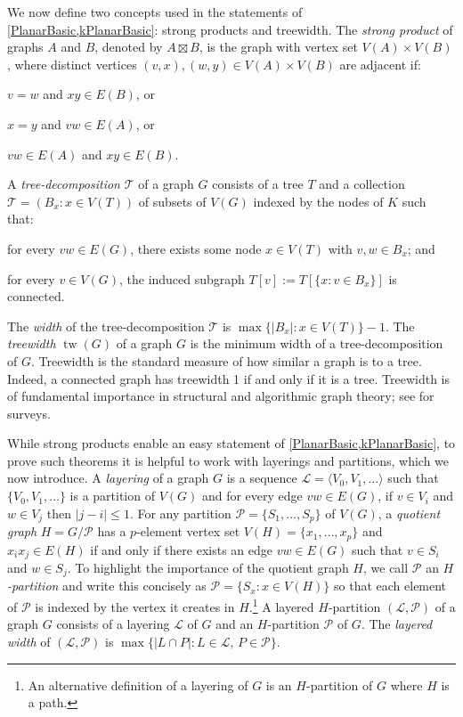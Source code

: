 \documentclass{patmorin}
\DeclareMathOperator{\tw}{tw}
\renewcommand{\leq}{\leqslant}
\begin{document}
We now define two concepts used in the statements of \cref{PlanarBasic,kPlanarBasic}: strong products and treewidth. The \emph{strong product} of graphs $A$ and $B$, denoted by $A\boxtimes B$, is the graph with vertex set $V(A)\times V(B)$, where distinct vertices $(v,x),(w,y)\in V(A)\times V(B)$ are adjacent if: 
\begin{compactitem}
\item  $v=w$ and $xy\in E(B)$, or 
\item  $x=y$ and $vw\in E(A)$, or  
\item  $vw\in E(A)$ and $xy\in E(B)$. 
\end{compactitem}
A \emph{tree-decomposition} $\mathcal{T}$ of a graph $G$ consists of a tree $T$ and a collection $\mathcal{T}=(B_x:x\in V(T))$ of subsets of $V(G)$ indexed by the nodes of $K$ such that:
\begin{compactenum}[(i)]
\item for every $vw\in E(G)$, there exists some node $x\in V(T)$ with $v,w\in B_x$; and 
\item for every $v\in V(G)$, the induced subgraph $T[v] := T[\{x: v\in B_x\}]$ is connected.  
\end{compactenum}
The \emph{width} of the tree-decomposition $\mathcal{T}$ is $\max\{|B_x|:x\in V(T)\}-1$.  The \emph{treewidth} $\tw(G)$ of a graph $G$ is the minimum width of a tree-decomposition of $G$.  Treewidth is the standard measure of how similar a graph is to a tree. Indeed, a connected graph has treewidth 1 if and only if it is a tree. Treewidth is of fundamental importance in structural and algorithmic graph theory; see \citep{Reed03,HW17,Bodlaender-TCS98} for surveys. 

While strong products enable an easy statement of \cref{PlanarBasic,kPlanarBasic}, to prove such theorems it is helpful to work with layerings and partitions, which we now introduce. A \emph{layering} of a graph $G$ is a sequence $\mathcal{L}=\langle V_0,V_1,\ldots\rangle$ such that $\{V_0,V_1,\ldots\}$ is a partition of $V(G)$ and for every edge $vw\in E(G)$, if $v\in V_i$ and $w\in V_j$ then $|j-i|\leq 1$.  For any partition $\mathcal{P}=\{S_1,\ldots,S_p\}$ of $V(G)$, a \emph{quotient graph} $H=G/\mathcal{P}$ has a $p$-element vertex set $V(H)=\{x_1,\ldots,x_p\}$ and $x_ix_j\in E(H)$ if and only if there exists an edge $vw\in E(G)$ such that $v\in S_i$ and $w\in S_j$. To highlight the importance of the quotient graph $H$, we call $\mathcal{P}$ an \emph{$H$-partition} and write this concisely as $\mathcal{P}=\{S_x : x\in V(H)\}$ so that each element of $\mathcal{P}$ is indexed by the vertex it creates in $H$.\footnote{An alternative definition of a layering of $G$ is an $H$-partition of $G$ where $H$ is a path.}  A layered $H$-partition $(\mathcal{L},\mathcal{P})$ of a graph $G$ consists of a layering $\mathcal{L}$ of $G$ and an $H$-partition $\mathcal{P}$ of $G$. The \emph{layered width} of $(\mathcal{L},\mathcal{P})$ is $\max\{|L\cap P|: L\in\mathcal{L},\, P\in\mathcal{P}\}$. 
\end{document}

